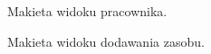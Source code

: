 \begin{figure}[H]
    \centering
    \caption{Makieta widoku pracownika.}
\end{figure}

\begin{figure}[H]
    \centering
    \caption{Makieta widoku dodawania zasobu.}
\end{figure}


